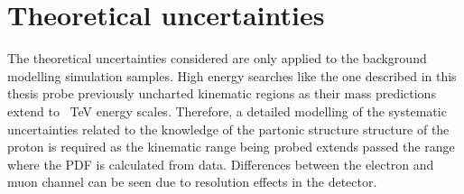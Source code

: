 \section{Theoretical uncertainties}\label{sec:sysmc:theory}
The theoretical uncertainties considered are only applied to the background modelling simulation samples. High energy searches like the one described in this thesis probe previously uncharted kinematic regions as their mass predictions extend to \SI{}{\tera\electronvolt} energy scales. Therefore, a detailed modelling of the systematic uncertainties related to the knowledge of the partonic structure structure of the proton is required as the kinematic range being probed extends passed the range where the PDF is calculated from data. Differences between the electron and muon channel can be seen due to resolution effects in the detector. 

